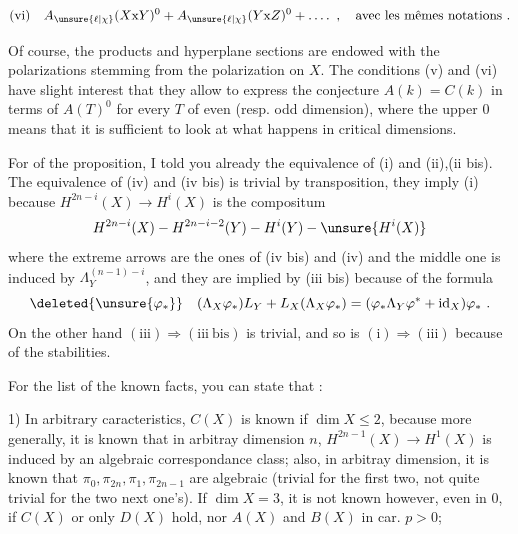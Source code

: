 
\[
\text{(vi)}\quad A_{\unsure{\ell|\chi}}(X\mathrm{x}Y)^0+A_{\unsure{\ell|\chi}}(Y\mathrm{x}Z)^0+\mathinner{\ldotp\ldotp\ldotp\ldotp}\ ,\quad\text{avec les mêmes notations .}
\]

Of course, the products and hyperplane sections are endowed with the polarizations stemming from the polarization on $X$. The conditions (v) and (vi) have  slight interest that they allow to express the conjecture $A(k)=C(k)$ in terms of $A(T)^0$ for every $T$ of even (resp. odd dimension), where the upper $0$ means that it is sufficient to look at what happens in critical dimensions.

For  of the proposition, I told you already the equivalence of (i) and (ii),(ii bis). The equivalence of (iv) and (iv bis) is trivial by transposition, they  imply (i) because $H^{2n-i}(X)\to H^i(X)$ is the compositum
\[
H^{2n-i}(X)\mathbin{-}H^{2n-i-2}(Y)\mathbin{-}H^i(Y)\mathbin{-}\unsure{H^i(X)}
\]
where the extreme arrows are the ones of (iv bis) and (iv) and the middle one is induced by $\Lambda_Y^{(n-1)-i}$, and they are implied by (iii bis) because of the formula
\[
\deleted{\unsure{\varphi_*}}\quad(\Lambda_X\varphi_*)L_Y+L_X(\Lambda_X\varphi_*)=(\varphi_*\Lambda_Y\varphi^*+\operatorname{id}_X)\varphi_*\ .
\]
On the other hand $(\mathrm{iii})\Rightarrow(\mathrm{iii\ bis})$ is trivial, and so is $(\mathrm{i})\Longrightarrow(\mathrm{iii})$ because of the stabilities.

For the list of the known facts, you can state that :

1) In arbitrary caracteristics, $C(X)$ is known if $\dim X\leq2$, because more generally, it is known that in arbitray dimension $n$, $H^{2n-1}(X)\to H^1(X)$ is induced by an algebraic correspondance class; also, in arbitray dimension, it is known that $\pi_0,\pi_{2n},\pi_1,\pi_{2n-1}$ are algebraic (trivial for the first two, not quite trivial for the two next one's). If $\dim X=3$, it is not known however, even in  $0$, if $C(X)$ or only $D(X)$ hold, nor $A(X)$ and $B(X)$ in car. $p>0$;

